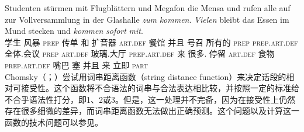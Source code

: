 \ea
\gll Studenten stürmen mit Flugblättern und Megafon die Mensa und rufen alle auf zur Vollversammlung in der Glashalle \emph{zum} \emph{kommen}. \emph{Vielen} bleibt das Essen im Mund stecken und \emph{kommen} \emph{sofort} \emph{mit}.\footnotemark\\
学生 风暴 \textsc{prep} 传单 和 扩音器 \textsc{art}.\textsc{def} 餐馆 并且 号召 所有的 \textsc{prep} \textsc{prep}.\textsc{art}.\textsc{def} 全体.会议 \textsc{prep} \textsc{art}.\textsc{def} 玻璃.大厅 \textsc{prep}.\textsc{art}.\textsc{def} 来 很多.\dat{} 停留 \textsc{art}.\textsc{def} 食物 \textsc{prep}.\textsc{art}.\textsc{def} 嘴巴 塞 并且 来 立即 \textsc{part}\\
\z
Chomsky（\citeyear[\S~5]{Chomsky75a}；\citeyear{Chomsky64a}）尝试用词串距离函数（string distance function）来决定话段的相对可接受性。这个函数将不合语法的词串与合法表达相比较，并按照一定的标准给不合乎语法性打分，即1、2或3。但是，这一处理并不完备，因为在接受性上仍然存在很多细微的差异，而词串距离函数无法做出正确预测。这个问题以及计算这一函数的技术问题可以参见。

